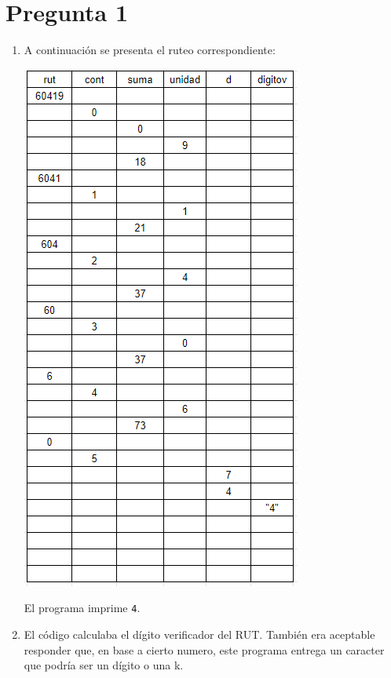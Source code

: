\vspace*{-0.4cm}
\section*{Pregunta 1}

\begin{enumerate}
    \item A continuación se presenta el ruteo correspondiente:
\begin{center}
    \includegraphics[scale=0.84]{Imagenes/ruteo_pauta}
\end{center}

    El programa imprime \texttt{4}.

    \item El código calculaba el dígito verificador del RUT. También era aceptable responder que, en base a cierto numero, este programa entrega un caracter que podría ser un dígito o una k.

\end{enumerate}


